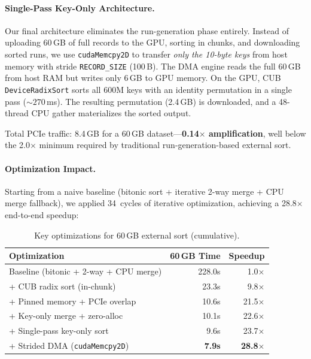 \documentclass[conference,10pt]{IEEEtran}
\begin{document}
\paragraph{Single-Pass Key-Only Architecture.}
Our final architecture eliminates the run-generation phase entirely.
Instead of uploading 60\,GB of full records to the GPU, sorting in
chunks, and downloading sorted runs, we use \texttt{cudaMemcpy2D} to
transfer \emph{only the 10-byte keys} from host memory with stride
\texttt{RECORD\_SIZE} (100\,B).  The DMA engine reads the full 60\,GB
from host RAM but writes only 6\,GB to GPU memory.  On the GPU, CUB
\texttt{DeviceRadixSort} sorts all 600M keys with an identity permutation
in a single pass (${\sim}270$\,ms).  The resulting permutation (2.4\,GB)
is downloaded, and a 48-thread CPU gather materializes the sorted output.

Total PCIe traffic: 8.4\,GB for a 60\,GB dataset---\textbf{0.14$\times$
amplification}, well below the 2.0$\times$ minimum required by
traditional run-generation-based external sort.

\paragraph{Optimization Impact.}
Starting from a naive baseline (bitonic sort + iterative 2-way merge +
CPU merge fallback), we applied 34~cycles of iterative optimization,
achieving a 28.8$\times$ end-to-end speedup:

\begin{table}[t]
  \centering
  \caption{Key optimizations for 60\,GB external sort (cumulative).}
  \label{tab:optimizations}
  \begin{tabular}{@{}lrr@{}}
    \toprule
    Optimization & 60\,GB Time & Speedup \\
    \midrule
    Baseline (bitonic + 2-way + CPU merge) & 228.0s & 1.0$\times$ \\
    + CUB radix sort (in-chunk) & 23.3s & 9.8$\times$ \\
    + Pinned memory + PCIe overlap & 10.6s & 21.5$\times$ \\
    + Key-only merge + zero-alloc & 10.1s & 22.6$\times$ \\
    + Single-pass key-only sort & 9.6s & 23.7$\times$ \\
    + Strided DMA (\texttt{cudaMemcpy2D}) & \textbf{7.9s} & \textbf{28.8$\times$} \\
    \bottomrule
  \end{tabular}
\end{table}
\end{document}
